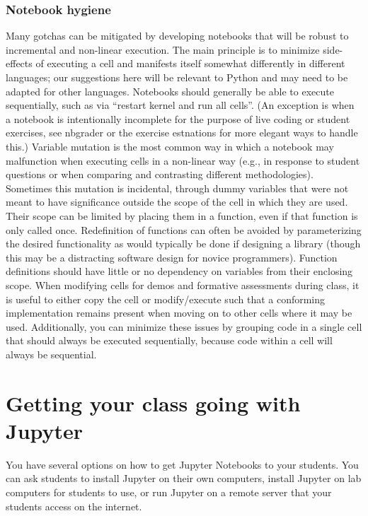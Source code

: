 \documentclass[]{book}
\begin{document}
\subsection{Notebook hygiene}\label{notebook-hygiene}

Many gotchas can be mitigated by developing notebooks that will be
robust to incremental and non-linear execution. The main principle is to
minimize side-effects of executing a cell and manifests itself somewhat
differently in different languages; our suggestions here will be
relevant to Python and may need to be adapted for other languages.
Notebooks should generally be able to execute sequentially, such as via
``restart kernel and run all cells''. (An exception is when a notebook
is intentionally incomplete for the purpose of live coding or student
exercises, see nbgrader or the exercise estnations for more elegant ways
to handle this.) Variable mutation is the most common way in which a
notebook may malfunction when executing cells in a non-linear way (e.g.,
in response to student questions or when comparing and contrasting
different methodologies). Sometimes this mutation is incidental, through
dummy variables that were not meant to have significance outside the
scope of the cell in which they are used. Their scope can be limited by
placing them in a function, even if that function is only called once.
Redefinition of functions can often be avoided by parameterizing the
desired functionality as would typically be done if designing a library
(though this may be a distracting software design for novice
programmers). Function definitions should have little or no dependency
on variables from their enclosing scope. When modifying cells for demos
and formative assessments during class, it is useful to either copy the
cell or modify/execute such that a conforming implementation remains
present when moving on to other cells where it may be used.
Additionally, you can minimize these issues by grouping code in a single
cell that should always be executed sequentially, because code within a
cell will always be sequential.

\chapter{Getting your class going with Jupyter}\label{getting-going}

You have several options on how to get Jupyter Notebooks to your
students. You can ask students to install Jupyter on their own
computers, install Jupyter on lab computers for students to use, or run
Jupyter on a remote server that your students access on the internet.
\end{document}
